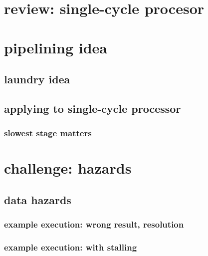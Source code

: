 \date{}
\title{}
\date{}

\begin{frame}
    \titlepage
\end{frame}

\section{review: single-cycle procesor}





\section{pipelining idea}

\subsection{laundry idea}



\subsection{applying to single-cycle processor}


\subsubsection{slowest stage matters}




\section{challenge: hazards}

\subsection{data hazards}

\subsubsection{example execution: wrong result, resolution}


\subsubsection{example execution: with stalling}

